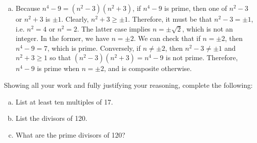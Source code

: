\documentclass[11pt,letterpaper]{article}
\begin{document}
\begin{enumerate}[(a)]
\item Because $n^4 - 9= (n^2 - 3)(n^2 + 3)$, if $n^4 - 9$ is prime, then one of $n^2 - 3$ or $n^2 + 3$ is $\pm 1$. Clearly, $n^2 + 3 \geq \pm 1$. Therefore, it must be that $n^2 - 3= \pm 1$, i.e. $n^2= 4$ or $n^2= 2$. The latter case implies $n= \pm \sqrt{2}$, which is not an integer. In the former, we have $n= \pm 2$. We can check that if $n= \pm 2$, then $n^4 - 9= 7$, which is prime. Conversely, if $n \neq \pm 2$, then $n^2 - 3 \neq \pm 1$ and $n^2 + 3 \geq 1$ so that $(n^2 - 3)(n^2 + 3)= n^4 - 9$ is not prime. Therefore, $n^4 - 9$ is prime when $n= \pm 2$, and is composite otherwise. 
\end{enumerate}



\newpage



 Showing all your work and fully justifying your reasoning, complete the following:
	\begin{enumerate}[(a)]
	\item List at least ten multiples of 17.
	\item List the divisors of 120.
	\item What are the prime divisors of 120?
	\end{enumerate} \pspace
\end{document}

